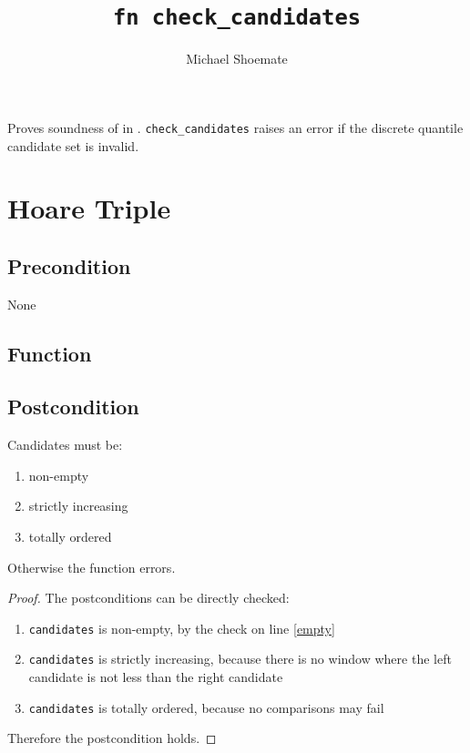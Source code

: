 \documentclass{article}
\title{\texttt{fn check\_candidates}}
\author{Michael Shoemate}
\begin{document}
\maketitle  


\contrib

Proves soundness of  
in .
\texttt{check\_candidates} raises an error if the discrete quantile candidate set is invalid.

\section{Hoare Triple}
\subsection*{Precondition}
None

\subsection*{Function}
\label{sec:python-pseudocode}


\subsection*{Postcondition}

\begin{theorem}
    Candidates must be:
    \begin{enumerate}
        \item non-empty
        \item strictly increasing
        \item totally ordered
    \end{enumerate}

    Otherwise the function errors.
\end{theorem}

\begin{proof}
    The postconditions can be directly checked:
    \begin{enumerate}
        \item \texttt{candidates} is non-empty, by the check on line \ref{empty}
        \item \texttt{candidates} is strictly increasing, 
            because there is no window where the left candidate is not less than the right candidate
        \item \texttt{candidates} is totally ordered, 
            because no comparisons may fail
    \end{enumerate}
    Therefore the postcondition holds.
\end{proof}
\end{document}
